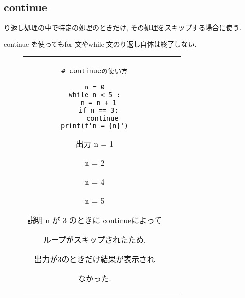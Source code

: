 \documentclass{jsarticle}
\begin{document}
\subsection{continue}
り返し処理の中で特定の処理のときだけ, その処理をスキップする場合に使う.  \par
continue を使ってもfor 文やwhile 文のり返し自体は終了しない.
\begin{figure}[h]
	\begin{tabular}{ccc}
		\begin{minipage}[t]{.45\textwidth}
			\begin{lstlisting}[caption=continue の使い方]
# continueの使い方

n = 0
while n < 5 :
  n = n + 1
  if n == 3:
    continue
  print(f'n = {n}')  \end{lstlisting}
		\end{minipage} \hspace{5mm}
		\begin{minipage}[t]{.1\textwidth}
			\begin{itembox}[l]{出力}
				n = 1 \par
				n = 2 \par
				n = 4 \par
				n = 5 \par
			\end{itembox}
		\end{minipage} \hspace{5mm}
		\begin{minipage}[t]{.4\textwidth}
			\begin{itembox}[l]{説明}
				n が 3 のときに continueによって\par ループがスキップされたため, \par
				出力が3のときだけ結果が表示され \par なかった.
			\end{itembox}
		\end{minipage}
	\end{tabular}
\end{figure}
\end{document}
